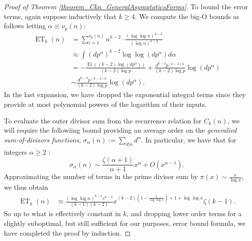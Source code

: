 \documentclass[11pt,reqno,a4letter]{article}
\numberwithin{figure}{section}
\numberwithin{table}{section}
\theoremstyle{plain}
\numberwithin{theorem}{section}
\theoremstyle{definition}
\begin{document}
\begin{proof}[Proof of Theorem \ref{theorem_Ckn_GeneralAsymptoticsForms}]
To bound the error terms, again suppose inductively that $k \geq 4$. We compute the 
big-O bounds as follows letting $\alpha \equiv \nu_p(n)$: 
\begin{align*} 
\operatorname{ET}_k(n) & = 
     \sum_{i=1}^{\nu_p(n)} n^{k-2} \cdot \frac{(\log\log n)^{k-2}}{(\log n)^{k-2}} \\ 
     & \approx 
     \int (dp^{\alpha})^{k-2} \log\log(dp^{\alpha}) d\alpha \\ 
     & = -\frac{\operatorname{Ei}((k-2) \log(dp^{\alpha}))}{(k-2) \log p} + 
     \frac{d^{k-2} p^{(k-2)\alpha}}{(k-2) \log p} \log(dp^{\alpha}) \\ 
     & \sim \frac{d^{k-2} p^{(k-2)\alpha}}{(k-2) \log p} \log(dp^{\alpha}). 
\end{align*} 
In the last expansion, we have dropped the exponential integral terms since they provide at most 
polynomial powers of the logarithm of their inputs. 

To evaluate the outer divisor sum from the recurrence relation for $C_k(n)$, we will require the 
followiing bound providing an average order on the \emph{generalied sum-of-divisors functions}, 
$\sigma_{\alpha}(n) := \sum_{d|n} d^{\alpha}$. In particular, we have that for integers $\alpha \geq 2$ 
\cite[\S 27.11]{NISTHB}: 
\[
\sigma_{\alpha}(n) \sim \frac{\zeta(\alpha+1)}{\alpha+1} x^{\alpha} + O(x^{\alpha-1}). 
\]
Approximating the number of terms in the prime divisor sum by $\pi(x) \sim \frac{x}{\log x}$, 
we thus obtain 
\begin{align*} 
\operatorname{ET}_k(n) & \approx \frac{(\log\log n)^{k-1} e^{k-2}}{(k-1)(k-2)} 
     x^{(k-2)\left(1-\frac{1}{\log\log x}\right)+1+\log\log x} \zeta(k-1). 
\end{align*} 
So up to what is effectively constant in $k$, and dropping lower order terms for a slightly 
suboptimal, but still sufficient for our purposes, error bound formula, 
we have completed the proof by induction. 
\end{proof} 
\end{document}
